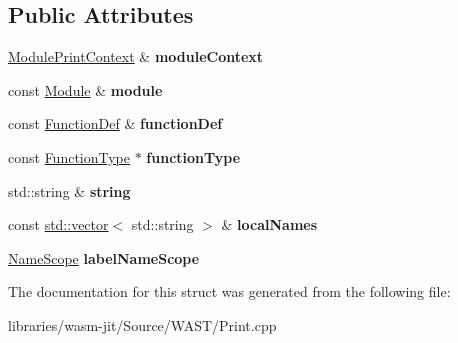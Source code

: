 \subsection*{Public Attributes}
\begin{DoxyCompactItemize}
\item 
\mbox{\label{struct_w_a_s_t_1_1_function_print_context_a41bcd02a27c7b7bc4d6e60dd49a64e20}} 
\mbox{\hyperlink{struct_w_a_s_t_1_1_module_print_context}{Module\+Print\+Context}} \& {\bfseries module\+Context}
\item 
\mbox{\label{struct_w_a_s_t_1_1_function_print_context_a0509d55001db500c18ca8e617447f6d5}} 
const \mbox{\hyperlink{struct_i_r_1_1_module}{Module}} \& {\bfseries module}
\item 
\mbox{\label{struct_w_a_s_t_1_1_function_print_context_ad712157c51ab0ff9ba3e3c7fe733e57d}} 
const \mbox{\hyperlink{struct_i_r_1_1_function_def}{Function\+Def}} \& {\bfseries function\+Def}
\item 
\mbox{\label{struct_w_a_s_t_1_1_function_print_context_a7a2e7433179a0b99da5557d737b7b08d}} 
const \mbox{\hyperlink{struct_i_r_1_1_function_type}{Function\+Type}} $\ast$ {\bfseries function\+Type}
\item 
\mbox{\label{struct_w_a_s_t_1_1_function_print_context_aa4a81843ac2ea39ddec1142a4b63ab2e}} 
std\+::string \& {\bfseries string}
\item 
\mbox{\label{struct_w_a_s_t_1_1_function_print_context_a3f60031b48c715b4bcc7bb7584227ad0}} 
const \mbox{\hyperlink{classstd_1_1vector}{std\+::vector}}$<$ std\+::string $>$ \& {\bfseries local\+Names}
\item 
\mbox{\label{struct_w_a_s_t_1_1_function_print_context_a55d66c30d02a1d62750bd91dfaeeba3c}} 
\mbox{\hyperlink{struct_w_a_s_t_1_1_name_scope}{Name\+Scope}} {\bfseries label\+Name\+Scope}
\end{DoxyCompactItemize}


The documentation for this struct was generated from the following file\+:\begin{DoxyCompactItemize}
\item 
libraries/wasm-\/jit/\+Source/\+W\+A\+S\+T/Print.\+cpp\end{DoxyCompactItemize}
